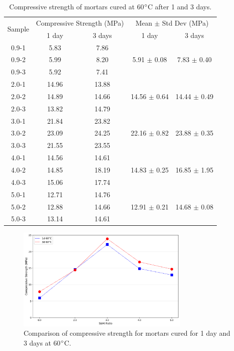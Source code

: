 \begin{table}[H]
\centering
\caption{Compressive strength of mortars cured at 60$^{\circ}$C after 1 and 3 days.}
\label{tab:compressive_strength_combined}
\begin{tabular}{ccccc}
\hline
\multirow{2}{*}{Sample} &
\multicolumn{2}{c}{Compressive Strength (MPa)} &
\multicolumn{2}{c}{Mean $\pm$ Std Dev (MPa)} \\
\cline{2-5}
 & 1 day & 3 days & 1 day & 3 days \\
\hline
0.9-1 & 5.83 & 7.86 & \multirow{3}{*}{5.91 $\pm$ 0.08} & \multirow{3}{*}{7.83 $\pm$ 0.40} \\
0.9-2 & 5.99 & 8.20 & & \\
0.9-3 & 5.92 & 7.41 & & \\
2.0-1 & 14.96 & 13.88 & \multirow{3}{*}{14.56 $\pm$ 0.64} & \multirow{3}{*}{14.44 $\pm$ 0.49} \\
2.0-2 & 14.89 & 14.66 & & \\
2.0-3 & 13.82 & 14.79 & & \\
3.0-1 & 21.84 & 23.82 & \multirow{3}{*}{22.16 $\pm$ 0.82} & \multirow{3}{*}{23.88 $\pm$ 0.35} \\
3.0-2 & 23.09 & 24.25 & & \\
3.0-3 & 21.55 & 23.55 & & \\
4.0-1 & 14.56 & 14.61 & \multirow{3}{*}{14.83 $\pm$ 0.25} & \multirow{3}{*}{16.85 $\pm$ 1.95} \\
4.0-2 & 14.85 & 18.19 & & \\
4.0-3 & 15.06 & 17.74 & & \\
5.0-1 & 12.71 & 14.76 & \multirow{3}{*}{12.91 $\pm$ 0.21} & \multirow{3}{*}{14.68 $\pm$ 0.08} \\
5.0-2 & 12.88 & 14.66 & & \\
5.0-3 & 13.14 & 14.61 & & \\
\hline
\end{tabular}
\end{table}

\begin{figure}[H]
  \centering
  \includegraphics[width=0.75\textwidth]{Cap4/images/compression_strength_comparison_1d_vs_3d.png}
  \caption{Comparison of compressive strength for mortars cured for 1 day and 3 days at 60$^{\circ}$C.}
  \label{fig:comparison_compression_strength}
\end{figure}
